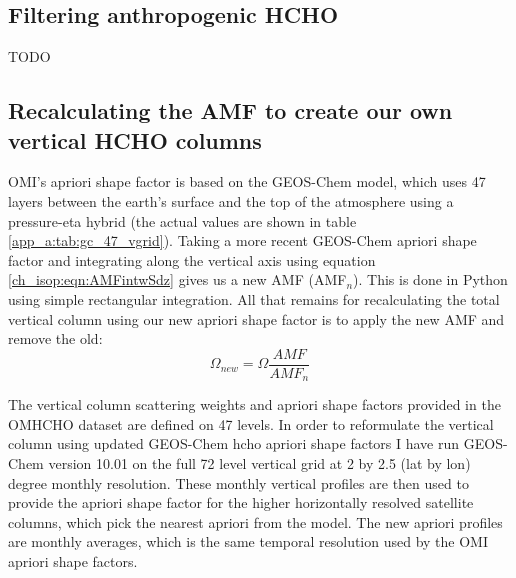   \subsection{Filtering anthropogenic HCHO}
    TODO
  
  \subsection{Recalculating the AMF to create our own vertical HCHO columns}
  \label{ch_isop:sec:recalculating_AMF_description}
    OMI's apriori shape factor is based on the GEOS-Chem model, which uses 47 layers between the earth's surface and the top of the atmosphere using a pressure-eta hybrid (the actual values are shown in table \ref{app_a:tab:gc_47_vgrid}).
    Taking a more recent GEOS-Chem apriori shape factor and integrating along the vertical axis using equation \ref{ch_isop:eqn:AMFintwSdz} gives us a new AMF (AMF$_n$).
    This is done in Python using simple rectangular integration.
    All that remains for recalculating the total vertical column using our new apriori shape factor is to apply the new AMF and remove the old:
    \begin{equation*}
      \Omega_{new} = \Omega \frac{AMF}{AMF_n} 
    \end{equation*}
    
    The vertical column scattering weights and apriori shape factors provided in the OMHCHO dataset are defined on 47 levels.
    In order to reformulate the vertical column using updated GEOS-Chem hcho apriori shape factors I have run GEOS-Chem version 10.01 on the full 72 level vertical grid at 2 by 2.5 (lat by lon) degree monthly resolution. 
    These monthly vertical profiles are then used to provide the apriori shape factor for the higher horizontally resolved satellite columns, which pick the nearest apriori from the model.
    The new apriori profiles are monthly averages, which is the same temporal resolution used by the OMI apriori shape factors.
    
